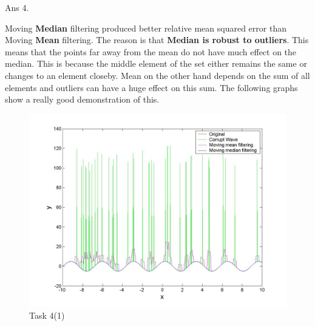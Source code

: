 \documentclass[11pt]{article}
\begin{document}
Ans 4.\begin{center}
Moving \textbf{Median} filtering produced better relative mean squared error than Moving \textbf{Mean} filtering. The reason is that \textbf{Median is robust to outliers}. This means that the points far away from the mean do not have much effect on the median. This is because the middle element of the set either remains the same or changes to an element closeby. Mean on the other hand depends on the sum of all elements and outliers can have a huge effect on this sum. The following graphs show a really good demonstration of this.
\begin{figure}
  \includegraphics[width=\linewidth]{1.jpg}
  \caption{Task 4(1)}
  \label{fig:task4_1}
\end{figure}
\end{center}
\end{document}
